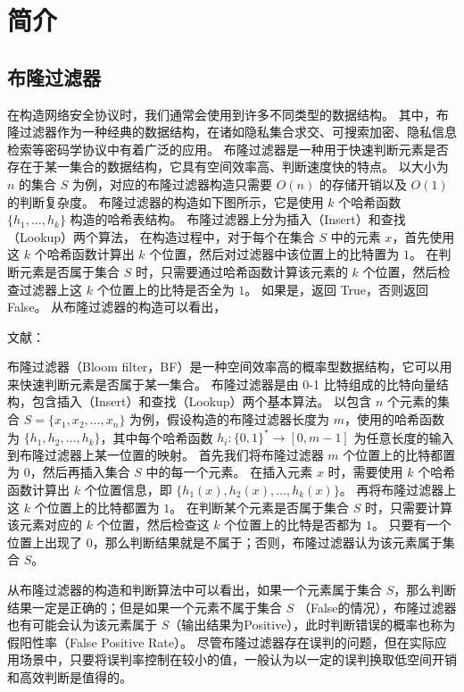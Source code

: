 
\chapter{简介}

\section{布隆过滤器}

在构造网络安全协议时，我们通常会使用到许多不同类型的数据结构。
其中，布隆过滤器作为一种经典的数据结构，在诸如隐私集合求交、可搜索加密、隐私信息检索等密码学协议中有着广泛的应用。
布隆过滤器是一种用于快速判断元素是否存在于某一集合的数据结构，它具有空间效率高、判断速度快的特点。
以大小为 $n$ 的集合 $S$ 为例，对应的布隆过滤器构造只需要 $O(n)$ 的存储开销以及 $O(1)$ 的判断复杂度。
布隆过滤器的构造如下图所示，它是使用 $k$ 个哈希函数 $\{h_1,\dots, h_k\}$ 构造的哈希表结构。
布隆过滤器上分为插入（Insert）和查找（Lookup）两个算法，
在构造过程中，对于每个在集合 $S$ 中的元素 $x$，首先使用这 $k$ 个哈希函数计算出 $k$ 个位置，然后对过滤器中该位置上的比特置为 $1$。
在判断元素是否属于集合 $S$ 时，只需要通过哈希函数计算该元素的 $k$ 个位置，然后检查过滤器上这 $k$ 个位置上的比特是否全为 $1$。
如果是，返回 True，否则返回 False。
从布隆过滤器的构造可以看出，


文献\cite{luo2019optimizing}：

布隆过滤器（Bloom filter，BF）是一种空间效率高的概率型数据结构，它可以用来快速判断元素是否属于某一集合。
布隆过滤器是由 0-1 比特组成的比特向量结构，包含插入（Insert）和查找（Lookup）两个基本算法。
以包含 $n$ 个元素的集合 $S=\{x_1, x_2, \dots, x_n\}$ 为例，假设构造的布隆过滤器长度为 $m$，使用的哈希函数为 $\{h_1, h_2, \dots, h_k\}$，其中每个哈希函数 $h_i:\{0,1\}^* \to [0, m-1]$ 为任意长度的输入到布隆过滤器上某一位置的映射。
首先我们将布隆过滤器 $m$ 个位置上的比特都置为 $0$，然后再插入集合 $S$ 中的每一个元素。
在插入元素 $x$ 时，需要使用 $k$ 个哈希函数计算出 $k$ 个位置信息，即 $\{h_1(x),h_2(x),\dots, h_k(x)\}$。
再将布隆过滤器上这 $k$ 个位置上的比特都置为 $1$。
在判断某个元素是否属于集合 $S$ 时，只需要计算该元素对应的 $k$ 个位置，然后检查这 $k$ 个位置上的比特是否都为 $1$。
只要有一个位置上出现了 $0$，那么判断结果就是不属于；否则，布隆过滤器认为该元素属于集合 $S$。

从布隆过滤器的构造和判断算法中可以看出，如果一个元素属于集合 $S$，那么判断结果一定是正确的；但是如果一个元素不属于集合 $S$ （False的情况），布隆过滤器也有可能会认为该元素属于 $S$（输出结果为Positive），此时判断错误的概率也称为假阳性率（False Positive Rate）。
尽管布隆过滤器存在误判的问题，但在实际应用场景中，只要将误判率控制在较小的值，一般认为以一定的误判换取低空间开销和高效判断是值得的。

